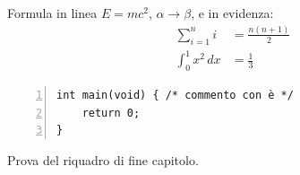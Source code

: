 Formula in linea $E = mc^2$, $\alpha \to \beta$, e in evidenza:
\begin{align}
\sum_{i=1}^{n} i &= \frac{n(n+1)}{2} \\
\int_0^1 x^2 \, dx &= \frac{1}{3}
\end{align}

\begin{lstlisting}[numbers=left]
int main(void) { /* commento con è */
    return 0;
}
\end{lstlisting}

\begin{center}
\end{center}

\begin{insintesi}
Prova del riquadro di fine capitolo.
\end{insintesi}
